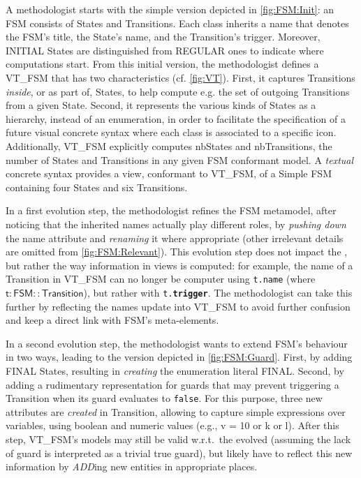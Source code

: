 A methodologist starts with the simple version depicted in \cref{fig:FSM:Init}:
an \textsf{FSM} consists of \textsf{State}s and \textsf{Transition}s. Each class
inherits a \textsf{name} that denotes the \textsf{FSM}'s title, the \textsf{State}'s
name, and the \textsf{Transition}'s trigger. Moreover, \textsf{INITIAL} \textsf{State}s
are distinguished from \textsf{REGULAR} ones to indicate where computations start.
From this initial version, the methodologist defines a \viewtype \textsf{VT\_FSM}
that has two characteristics (cf. \cref{fig:VT}). First, it captures \textsf{Transition}s \emph{inside},
or as part of, \textsf{State}s, to help compute e.g. the set of outgoing 
\textsf{Transition}s from a given \textsf{State}. Second, it represents the various
\textsf{kind}s of \textsf{State}s as a hierarchy, instead of an enumeration,
in order to facilitate the specification of a future visual concrete syntax where
each class is associated to a specific icon.
Additionally, \textsf{VT\_FSM} explicitly computes \textsf{nbStates} and 
\textsf{nbTransitions}, the number of \textsf{State}s and \textsf{Transition}s 
in any given \textsf{FSM} conformant model. A \emph{textual} concrete syntax 
provides a view, conformant to \textsf{VT\_FSM}, of a \textsf{Simple FSM} containing
four \textsf{State}s and six \textsf{Transition}s.


In a first evolution step, the methodologist refines the \textsf{FSM} metamodel,
after noticing that the inherited \textsf{name}s actually play different roles,
by  \emph{pushing down} the \textsf{name} attribute and \emph{renaming} it where
appropriate (other irrelevant details are omitted from \cref{fig:FSM:Relevant}). 
This evolution step does not impact the \viewtypes, but rather the way information
in views is computed: for example, the \textsf{name} of a \textsf{Transition} in
\textsf{VT\_FSM} can no longer be computer using \texttt{t.name} (where 
$\mathsf{t : FSM::Transition}$), but rather with \texttt{t.\textbf{trigger}}. 
The methodologist can take this further by reflecting the \textsf{name}s update
into \textsf{VT\_FSM} to avoid further confusion and keep a direct link with
\textsf{FSM}'s meta-elements.

In a second evolution step, the methodologist wants to extend \textsf{FSM}'s 
behaviour in two ways, leading to the version depicted in \cref{fig:FSM:Guard}. First, by adding \textsf{FINAL} \textsf{State}s,
resulting in \emph{creating} the enumeration literal \textsf{FINAL}.
Second, by adding a rudimentary representation for guards that may prevent 
triggering a \textsf{Transition} when its guard evaluates to \texttt{false}. 
For this purpose, three new attributes are \emph{created} in \textsf{Transition}, allowing to capture
simple expressions over \textsf{var}iables, using boolean and numeric \textsf{value}s
(e.g., \textsf{v = 10} or \textsf{k or l}). After this step, \textsf{VT\_FSM}'s
models may still be valid w.r.t.~the evolved \metamodel (assuming the lack of 
guard is interpreted as a trivial \textsf{true} guard),
but \viewtypes likely have to reflect this new information by \emph{ADD}ing new entities in appropriate places.

